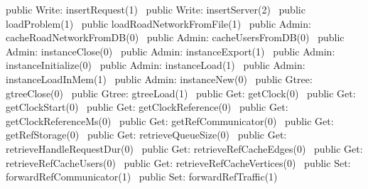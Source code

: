public \LA{}Write: insertRequest(1)~{\nwtagstyle{}}\RA{}
public \LA{}Write: insertServer(2)~{\nwtagstyle{}}\RA{}
public \LA{}loadProblem(1)~{\nwtagstyle{}}\RA{}
public \LA{}loadRoadNetworkFromFile(1)~{\nwtagstyle{}}\RA{}
\nwendcode{}\nwdocspar
{}
\nwenddocs{}\plusendmoddef
public \LA{}Admin: cacheRoadNetworkFromDB(0)~{\nwtagstyle{}}\RA{}
public \LA{}Admin: cacheUsersFromDB(0)~{\nwtagstyle{}}\RA{}
public \LA{}Admin: instanceClose(0)~{\nwtagstyle{}}\RA{}
public \LA{}Admin: instanceExport(1)~{\nwtagstyle{}}\RA{}
public \LA{}Admin: instanceInitialize(0)~{\nwtagstyle{}}\RA{}
public \LA{}Admin: instanceLoad(1)~{\nwtagstyle{}}\RA{}
public \LA{}Admin: instanceLoadInMem(1)~{\nwtagstyle{}}\RA{}
public \LA{}Admin: instanceNew(0)~{\nwtagstyle{}}\RA{}
public \LA{}Gtree: gtreeClose(0)~{\nwtagstyle{}}\RA{}
public \LA{}Gtree: gtreeLoad(1)~{\nwtagstyle{}}\RA{}
public \LA{}Get: getClock(0)~{\nwtagstyle{}}\RA{}
public \LA{}Get: getClockStart(0)~{\nwtagstyle{}}\RA{}
public \LA{}Get: getClockReference(0)~{\nwtagstyle{}}\RA{}
public \LA{}Get: getClockReferenceMs(0)~{\nwtagstyle{}}\RA{}
public \LA{}Get: getRefCommunicator(0)~{\nwtagstyle{}}\RA{}
public \LA{}Get: getRefStorage(0)~{\nwtagstyle{}}\RA{}
public \LA{}Get: retrieveQueueSize(0)~{\nwtagstyle{}}\RA{}
public \LA{}Get: retrieveHandleRequestDur(0)~{\nwtagstyle{}}\RA{}
public \LA{}Get: retrieveRefCacheEdges(0)~{\nwtagstyle{}}\RA{}
public \LA{}Get: retrieveRefCacheUsers(0)~{\nwtagstyle{}}\RA{}
public \LA{}Get: retrieveRefCacheVertices(0)~{\nwtagstyle{}}\RA{}
public \LA{}Set: forwardRefCommunicator(1)~{\nwtagstyle{}}\RA{}
public \LA{}Set: forwardRefTraffic(1)~{\nwtagstyle{}}\RA{}
